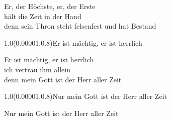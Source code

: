 \documentclass[aspectratio=169]{beamer}
\begin{document}
\begin{frame}
\centering
\color{white}
\huge{Er, der Höchste, er, der Erste} \\
\huge{hält die Zeit in der Hand} \\
\huge{denn sein Thron steht felsenfest und hat Bestand} \\

\begin{textblock}{1.0}(0.00001,0.8)\color{gray}\normalsize{Er ist mächtig, er ist herrlich}\end{textblock}
\end{frame}

\begin{frame}
\centering
\color{white}
\huge{Er ist mächtig, er ist herrlich} \\
\huge{ich vertrau ihm allein} \\
\huge{denn mein Gott ist der Herr aller Zeit} \\

\begin{textblock}{1.0}(0.00001,0.8)\color{gray}\normalsize{Nur mein Gott ist der Herr aller Zeit}\end{textblock}
\end{frame}

\begin{frame}
\centering
\color{white}
\huge{Nur mein Gott ist der Herr aller Zeit} \\
\end{frame}
\end{document}
